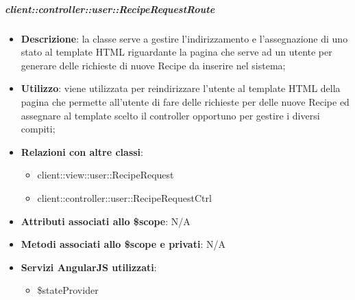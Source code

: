 		\subparagraph{client::controller::user::RecipeRequestRoute} %
		\label{subp:bdsm_app_client_controller_user_reciperequestrouteconfig}
			\begin{itemize}
				\item \textbf{Descrizione}: la classe serve a gestire l'indirizzamento e l'assegnazione di uno stato al template HTML riguardante la pagina che serve ad un utente per generare delle richieste di nuove Recipe da inserire nel sistema;
				\item \textbf{Utilizzo}: viene utilizzata per reindirizzare l'utente al template HTML della pagina che permette all'utente di fare delle richieste per delle nuove Recipe ed assegnare al template scelto il controller opportuno per gestire i diversi compiti;
				\item \textbf{Relazioni con altre classi}:
					\begin{itemize}
						\item client::view::user::RecipeRequest
						\item client::controller::user::RecipeRequestCtrl
					\end{itemize}
				\item \textbf{Attributi associati allo \$scope}: N/A
				\item \textbf{Metodi associati allo \$scope e privati}: N/A
				\item \textbf{Servizi AngularJS utilizzati}:
					\begin{itemize}
						\item \$stateProvider
					\end{itemize}
			\end{itemize}

